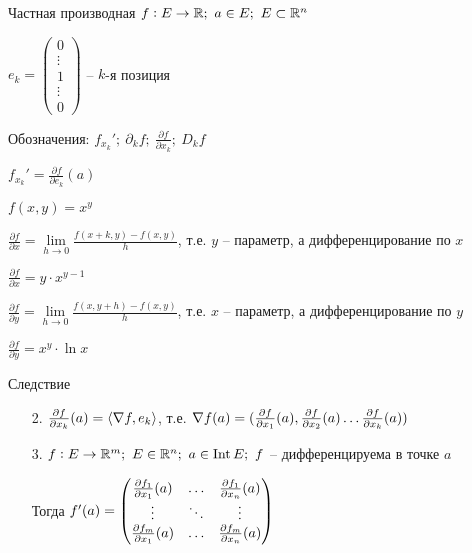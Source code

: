 \documentclass[12pt]{article}
\begin{document}
\begin{defin}{Частная производная}
    $f : E \to \mathbb R;\ a \in E;\ E \subset \mathbb R^n$

    $e_k = \begin{pmatrix}
        0 \\
        \vdots \\
        1 \\
        \vdots \\
        0
    \end{pmatrix}$ -- $k$-я позиция

    Обозначения: $f_{x_k}';\ \partial_k f;\ \frac{\partial f}{\partial x_k};\ D_k f$

    $f_{x_k}' = \frac{\partial f}{\partial e_k}(a)$
\end{defin}

\begin{Example}{}
    $f(x, y) = x^y$

    $\frac{\partial f}{\partial x} = \lim\limits_{h \to 0} \frac{f(x + k, y) - f(x, y)}{h}$, т.е. $y$ -- параметр, а дифференцирование по $x$

    $\frac{\partial f}{\partial x} = y \cdot x^{y - 1}$

    $\frac{\partial f}{\partial y} = \lim\limits_{h \to 0} \frac{f(x, y + h) - f(x, y)}{h}$, т.е. $x$ -- параметр, а дифференцирование по $y$

    $\frac{\partial f}{\partial y} = x^y \cdot \ln{x}$
\end{Example}

\begin{theo}{Следствие}
    \begin{enumerate}
        \item[2.] $\frac{\partial f}{\partial x_k}(a) = \langle \nabla f, e_k \rangle$, т.е. $\nabla f(a) = (\frac{\partial f}{\partial x_1}(a), \frac{\partial f}{\partial x_2}(a) \ldots \frac{\partial f}{\partial x_k}(a))$
        \item[3.] $f : E \to \mathbb R^m;\ E \in \mathbb R^n;\ a \in \operatorname{Int} E;\ f$ -- дифференцируема в точке $a$
        
        Тогда $f'(a) = \begin{pmatrix}
            \frac{\partial f_1}{\partial x_1}(a) & \ldots & \frac{\partial f_1}{\partial x_n}(a) \\
            \vdots & \ddots & \vdots \\
            \frac{\partial f_m}{\partial x_1}(a) & \ldots & \frac{\partial f_m}{\partial x_n}(a)
        \end{pmatrix}$
    \end{enumerate}
\end{theo}
\end{document}
